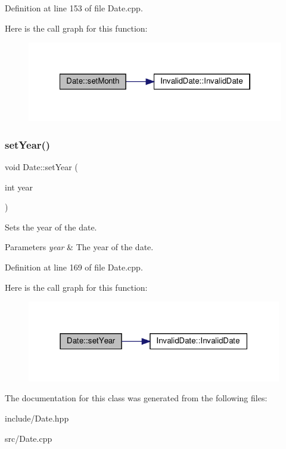 Definition at line 153 of file Date.\+cpp.

Here is the call graph for this function\+:\nopagebreak
\begin{figure}[H]
\begin{center}
\leavevmode
\includegraphics[width=322pt]{classDate_aa83b79359070012ab58ff99abeb34340_cgraph}
\end{center}
\end{figure}
\mbox{\label{classDate_a895c4ae9868e43577cf59d9c679d7a71}} 
\subsubsection{\texorpdfstring{set\+Year()}{setYear()}}
{\footnotesize\ttfamily void Date\+::set\+Year (\begin{DoxyParamCaption}\item[{int}]{year }\end{DoxyParamCaption})}

Sets the year of the date. 
\begin{DoxyParams}{Parameters}
{\em year} & The year of the date. \\
\hline
\end{DoxyParams}


Definition at line 169 of file Date.\+cpp.

Here is the call graph for this function\+:\nopagebreak
\begin{figure}[H]
\begin{center}
\leavevmode
\includegraphics[width=315pt]{classDate_a895c4ae9868e43577cf59d9c679d7a71_cgraph}
\end{center}
\end{figure}


The documentation for this class was generated from the following files\+:\begin{DoxyCompactItemize}
\item 
include/Date.\+hpp\item 
src/Date.\+cpp\end{DoxyCompactItemize}
